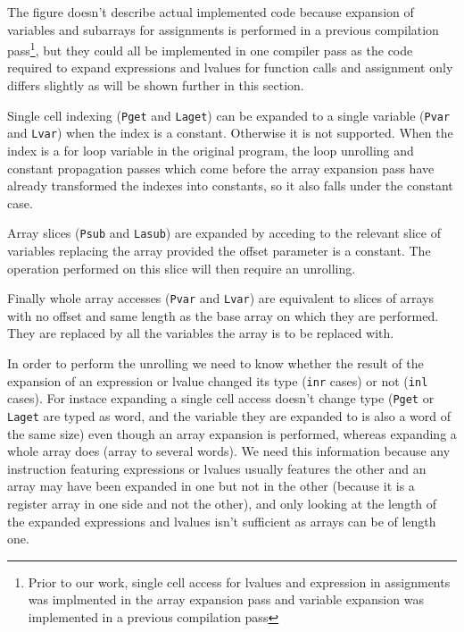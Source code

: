\documentclass{article}
\begin{document}
The figure doesn't describe actual implemented code because expansion of
variables and subarrays for assignments is performed in a previous compilation
pass\footnote{Prior to our work, single cell access for lvalues and expression
in assignments was implmented in the array expansion pass and variable expansion
was implemented in a previous compilation pass}, but they could all be
implemented in one compiler pass as the code required to expand expressions and
lvalues for function calls and assignment only differs slightly as will be shown
further in this section.

\smallskip

Single cell indexing (\texttt{Pget} and \texttt{Laget}) can be expanded to a
single variable (\texttt{Pvar} and \texttt{Lvar}) when the index is a constant.
Otherwise it is not supported. When the index is a for loop variable in the
original program, the loop unrolling and constant propagation passes which come
before the array expansion pass have already transformed the indexes into
constants, so it also falls under the constant case.

Array slices (\texttt{Psub} and \texttt{Lasub}) are expanded by acceding to
the relevant slice of variables replacing the array provided the offset
parameter is a constant. The operation performed on this slice will then require
an unrolling.

Finally whole array accesses (\texttt{Pvar} and \texttt{Lvar}) are equivalent to
slices of arrays with no offset and same length as the base array on which they
are performed. They are replaced by all the variables the array is to be
replaced with.

\smallskip

In order to perform the unrolling we need to know whether the result of the
expansion of an expression or lvalue changed its type (\texttt{inr} cases) or
not (\texttt{inl} cases). For instace expanding a single cell access doesn't
change type (\texttt{Pget} or \texttt{Laget} are typed as word, and the variable
they are expanded to is also a word of the same size) even though an array
expansion is performed, whereas expanding a whole array does (array to several
words). We need this information because any instruction featuring expressions
or lvalues usually features the other and an array may have been expanded in one
but not in the other (because it is a register array in one side and not the
other), and only looking at the length of the expanded expressions and lvalues
isn't sufficient as arrays can be of length one.
\end{document}
